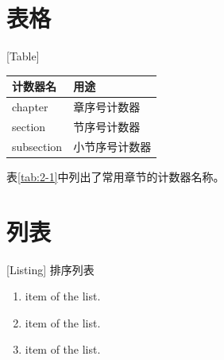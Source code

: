 \section{表格}[Table]
\begin{table}[!h]
\centering
{}
\begin{tabular}{@{}ll@{}}
\toprule[1pt]
计数器名   & 用途            \\ \midrule
chapter    & 章序号计数器    \\
section    & 节序号计数器    \\
subsection & 小节序号计数器  \\
\bottomrule[1pt]
\end{tabular}
\end{table}

表\ref{tab:2-1}中列出了常用章节的计数器名称。

\section{列表}[Listing]
排序列表
\begin{enumerate}
  \item item of the list.
  \item item of the list.
  \item item of the list.
\end{enumerate}


